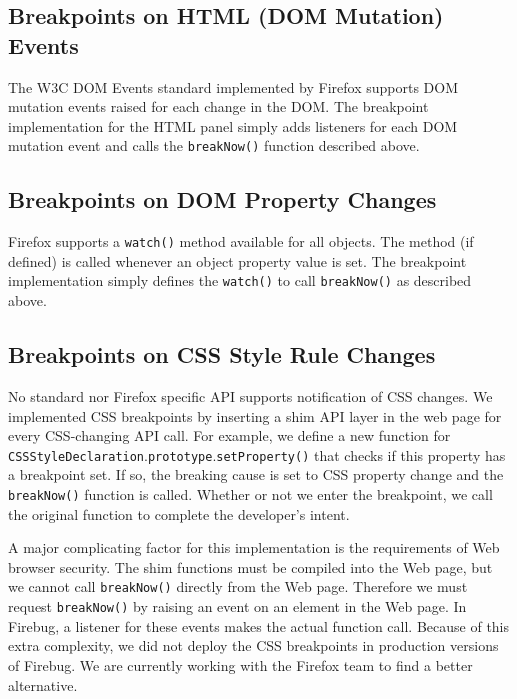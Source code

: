 \documentclass{www2010-accepted}
\begin{document}
\subsection{Breakpoints on HTML (DOM Mutation) Events}

The W3C DOM Events standard\cite{Pixley2000Events} implemented by Firefox supports DOM
mutation events raised for each change in the DOM. The breakpoint
implementation for the HTML panel simply adds listeners for each DOM
mutation event and calls the \texttt{breakNow()} function described above.

\subsection{Breakpoints on DOM Property Changes}

Firefox supports a \texttt{watch()} method available for all
objects. The method (if defined) is called whenever an object property
value is set. The breakpoint implementation simply defines the \texttt{watch()} to call
\texttt{breakNow()} as described above.

\subsection{Breakpoints on CSS Style Rule Changes}

No standard nor Firefox specific API supports notification of CSS
changes. We implemented CSS breakpoints by inserting a shim API layer in
the web page for every CSS-changing API call. For example, we define a
new function for
\texttt{CSSStyleDeclaration}.\texttt{prototype}.\texttt{setProperty()}
that checks if this property has a breakpoint set. If so, the breaking
cause is set to CSS property change and the \texttt{breakNow()}
function is called. Whether or not we enter the breakpoint, we call
the original function to complete the developer's intent.

A major complicating factor for this implementation is the
requirements of Web browser security.  The shim functions must be
compiled into the Web page, but we cannot call \texttt{breakNow()}
directly from the Web page. Therefore we must request
\texttt{breakNow()} by raising an event on an element in the Web
page. In Firebug, a listener for these events makes the actual function
call. Because of this extra complexity, we did not deploy the CSS breakpoints 
in production versions of Firebug.  We are currently working with the 
Firefox team to find a better alternative.
\end{document}
